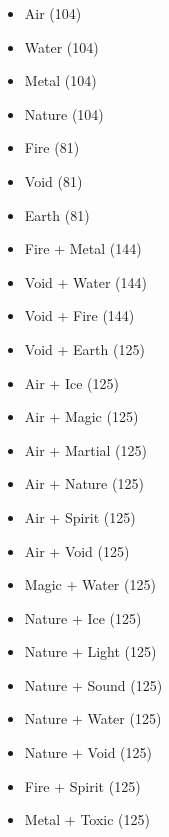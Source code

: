 \begin{itemize}
	\item{Air (104)}
	\item{Water (104)}
	\item{Metal (104)}
	\item{Nature (104)}
	\item{Fire (81)}
	\item{Void (81)}
	\item{Earth (81)}
\end{itemize}

\begin{itemize}
	\item{Fire + Metal (144)}
	\item{Void + Water (144)}
	\item{Void + Fire (144)}


	
	\item{Void + Earth (125)}	

	\item{Air + Ice (125)}	
	\item{Air + Magic (125)}
	\item{Air + Martial (125)}
	\item{Air + Nature (125)}
	\item{Air + Spirit (125)}
	\item{Air + Void (125)}
		
	\item{Magic + Water (125)}

	\item{Nature + Ice (125)}
	\item{Nature + Light (125)}
	\item{Nature + Sound (125)}
	\item{Nature + Water (125)}
	\item{Nature + Void (125)}	

	
	\item{Fire + Spirit (125)}

	\item{Metal + Toxic (125)}


\end{itemize}

\newpage


